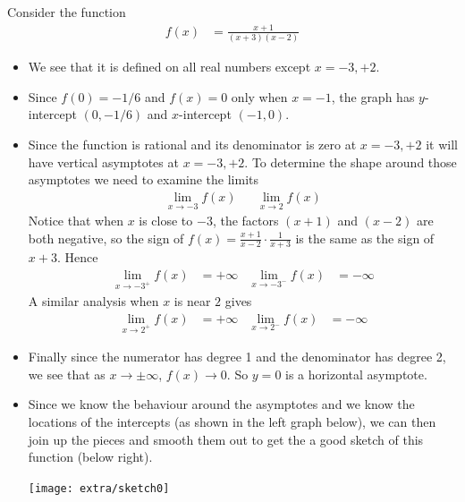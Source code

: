 \begin{eg}\label{eg_3_6_1}
 Consider the function
\begin{align*}
  f(x) &= \frac{x+1}{(x+3)(x-2)}
\end{align*}
\begin{itemize}
 \item We see that it is defined on all real numbers except $x=-3,+2$.
\item Since $f(0)=-1/6$ and $f(x)=0$ only when $x=-1$, the graph has $y$-intercept
$(0,-1/6)$ and $x$-intercept $(-1,0)$.

\item Since the function is rational and its denominator is zero at $x=-3,+2$ it will
have vertical asymptotes at $x=-3,+2$. To determine the shape around those
asymptotes we need to examine the limits
\begin{align*}
  \lim_{x\to -3} f(x) && \lim_{x\to2} f(x)
\end{align*}
Notice that when $x$ is close to $-3$, the factors $(x+1)$ and $(x-2)$ are both negative,
so the sign of $f(x) = \frac{x+1}{x-2} \cdot \frac{1}{x+3}$ is the same as the sign of
$x+3$. Hence
\begin{align*}
  \lim_{x\to -3^+} f(x) &= +\infty &
  \lim_{x\to -3^-} f(x) &= -\infty
\end{align*}
A similar analysis when $x$ is near $2$ gives
\begin{align*}
  \lim_{x\to 2^+} f(x) &= +\infty &
  \lim_{x\to 2^-} f(x) &= -\infty
\end{align*}

\item Finally since the numerator has degree 1 and the denominator has degree 2, we see
that as $x \to \pm \infty$, $f(x) \to 0$. So $y=0$ is a horizontal asymptote.

\item Since we know the behaviour around the asymptotes and we know the locations of the
intercepts (as shown in the left graph below), we can then join up the pieces
and smooth them out to get the a good sketch of this function (below right).
\begin{efig}
 \begin{center}
  \texttt{[image: extra/sketch0]}
 \end{center}
\end{efig}

\end{itemize}


\end{eg}


